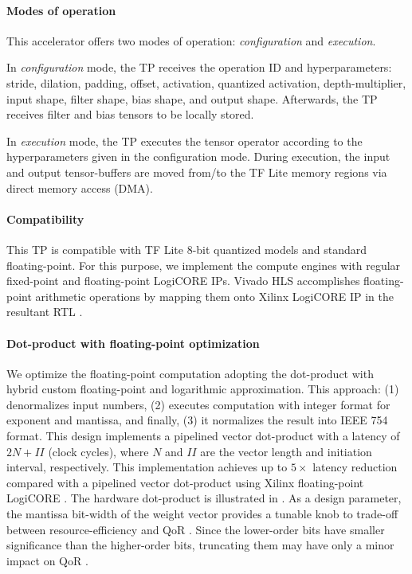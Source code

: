 \paragraph{\textbf{Modes of operation}} This accelerator offers two modes of operation: \emph{configuration} and \emph{execution}.

In \emph{configuration} mode, the TP receives the operation ID and hyperparameters: stride, dilation, padding, offset, activation, quantized activation, depth-multiplier, input shape, filter shape, bias shape, and output shape. Afterwards, the TP receives filter and bias tensors to be locally stored.

In \emph{execution} mode, the TP executes the tensor operator according to the hyperparameters given in the configuration mode. During execution, the input and output tensor-buffers are moved from/to the TF Lite memory regions via direct memory access (DMA).

\paragraph{\textbf{Compatibility}}

 This TP is compatible with TF Lite 8-bit quantized models and standard floating-point. For this purpose, we implement the compute engines with regular fixed-point and floating-point LogiCORE IPs.
 Vivado HLS accomplishes floating-point arithmetic operations by mapping
 them onto Xilinx LogiCORE IP in the resultant RTL \cite{hrica2012floating}.
 
\paragraph{\textbf{Dot-product with floating-point optimization}}
\label{sec:dot_product}
We optimize the floating-point computation adopting the dot-product with hybrid custom floating-point and logarithmic approximation\cite{nevarez2021accelerating}. This approach: (1) denormalizes input numbers, (2) executes computation with integer format for exponent and mantissa, and finally, (3) it normalizes the result into IEEE 754 format. This design implements a pipelined vector dot-product with a latency of $2N+II$ (clock cycles), where $N$ and $II$ are the vector length and initiation interval, respectively. This implementation achieves up to $5\times$ latency reduction compared with a pipelined vector dot-product using Xilinx floating-point LogiCORE \cite{nevarez2021accelerating}. The hardware dot-product is illustrated in . As a design parameter, the mantissa bit-width of the weight vector provides a tunable knob to trade-off between resource-efficiency and QoR \cite{park2009dynamic}. Since the lower-order bits have smaller significance than the higher-order bits, truncating them may
have only a minor impact on QoR \cite{mittal2016survey}.

